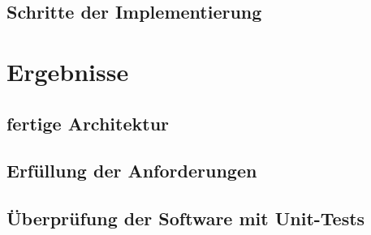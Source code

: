 \subsection{Schritte der Implementierung}
\label{subsec:Implementierung}

\section{Ergebnisse}
\label{sec:Ergebnisse}

\subsection{fertige Architektur}
\label{subsec:f_architektur}

\subsection{Erf\"ullung der Anforderungen}
\label{subsec:erfullung_anforderungen}

\subsection{\"Uberpr\"ufung der Software mit Unit-Tests}
\label{subsec:unittests}
